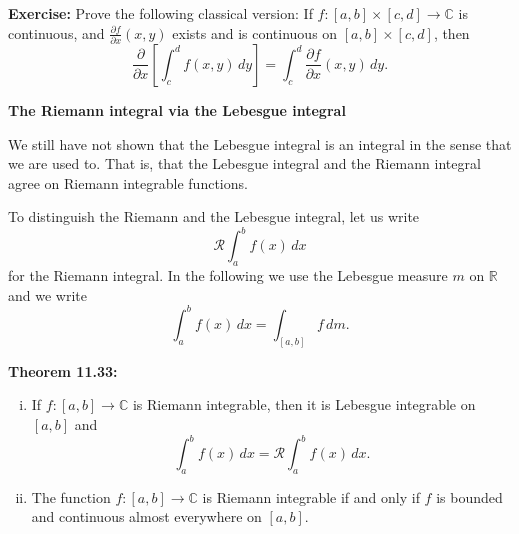 \documentclass[12pt]{book}
\newcommand{\C}{{\mathbb{C}}}
\newcommand{\R}{{\mathbb{R}}}
\newcommand{\sR}{{\mathcal{R}}}
\theoremstyle{plain}
\theoremstyle{remark}
\theoremstyle{definition}
\theoremstyle{exercise}
\theoremstyle{example}
\begin{document}
\medskip

\textbf{Exercise:}
Prove the following classical version:
If $f \colon [a,b]
\times [c,d] \to \C$ is continuous, and $\frac{\partial f}{\partial x}(x,y)$
exists and is continuous on $[a,b] \times [c,d]$, then
$$
\frac{\partial}{\partial x} \left[\int_c^d f(x,y) \, dy \right] =
\int_c^d \frac{\partial f}{\partial x}(x,y) \, dy .
$$

\medskip

\textbf{The Riemann integral via the Lebesgue integral}

\medskip

We still have not shown that the Lebesgue integral is an integral in the
sense that we are used to.  That is, that the Lebesgue integral and the
Riemann integral agree on Riemann integrable functions.

To distinguish the Riemann and the Lebesgue integral, let us write
$$
\sR \!\! \int_a^b f(x)\, dx
$$
for the Riemann integral.
In the following we use the Lebesgue measure $m$ on $\R$ and we 
write
$$
\int_a^b f(x) \, dx = \int_{[a,b]} f\,dm .
$$

\medskip

\pagebreak[2]

\textbf{Theorem 11.33:}
\nopagebreak
\begin{enumerate}[(i)]
\item If $f \colon [a,b] \to \C$ is Riemann integrable, then it is Lebesgue
integrable on $[a,b]$ and
$$
\int_a^b f(x)\, dx = \sR \!\! \int_a^b f(x)\, dx .
$$
\item The function $f \colon [a,b] \to \C$ is Riemann integrable if and only
if $f$ is bounded and continuous almost everywhere on $[a,b]$.
\end{enumerate}

\medskip
\end{document}
